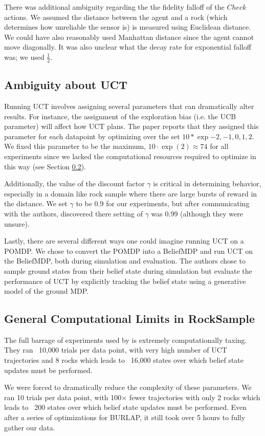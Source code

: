 \documentclass[11pt]{article} %
\begin{document}
There was additional ambiguity regarding the the fidelity falloff of the $Check$ actions. We assumed the distance between the agent and a rock (which determines how unreliable the sensor is) is measured using Euclidean distance. We could have also reasonably used Manhattan distance since the agent cannot move diagonally. It was also unclear what the decay rate for exponential falloff was; we used $\frac{1}{2}$.

\subsection{Ambiguity about UCT}

Running UCT involves assigning several parameters that can dramatically alter results. For instance, the assignment of the exploration bias (i.e. the UCB parameter) will affect how UCT plans. The paper reports that they assigned this parameter for each datapoint by optimizing over the set $10 * \exp{-2, -1, 0, 1, 2}$. We fixed this parameter to be the maximum, $10 \cdot \exp(2) \approx 74$ for all experiments since we lacked the computational resources required to optimize in this way (see Section \ref{sec: compLim}).

Additionally, the value of the discount factor $\gamma$ is critical in determining behavior, especially in a domain like rock sample where there are large bursts of reward in the distance. We set $\gamma$ to be $0.9$ for our experiments, but after communicating with the authors, discovered there setting of $\gamma$ was 0.99 (although they were unsure). 

Lastly, there are several different ways one could imagine running UCT on a POMDP. We chose to convert the POMDP into a BeliefMDP and run UCT on the BeliefMDP, both during simulation and evaluation. The authors chose to sample ground states from their belief state during simulation but evaluate the performance of UCT by explicitly tracking the belief state using a generative model of the ground MDP.

\subsection{General Computational Limits in RockSample}
\label{sec: compLim}
The full barrage of experiments used by \cite{jiang2015dependence} is extremely computationally taxing. They ran ~10,000 trials per data point, with very high number of UCT trajectories and 8 rocks which leads to ~16,000 states over which belief state updates must be performed. 

We were forced to dramatically reduce the complexity of these parameters. We ran 10 trials per data point, with 100$\times$ fewer trajectories with only 2 rocks which leads to ~200 states over which belief state updates must be performed. Even after a series of optimizations for BURLAP, it still took over 5 hours to fully gather our data.




\end{document}
